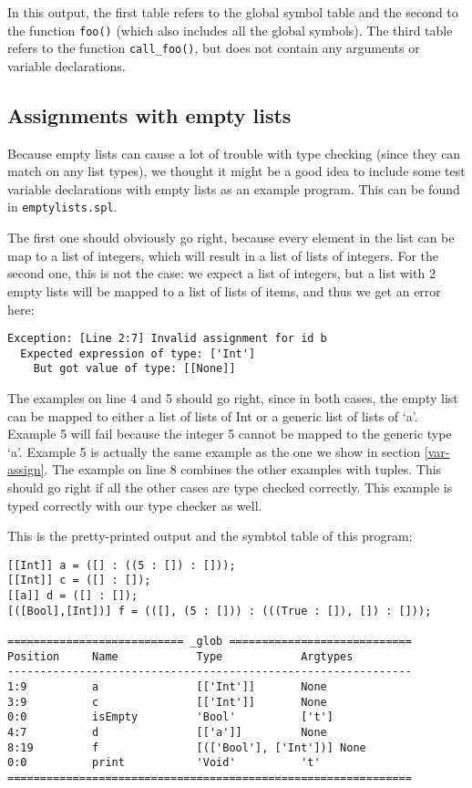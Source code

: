\documentclass[a4paper]{article}
\begin{document}
In this output, the first table refers to the global symbol table and the second to the function {\tt foo()} (which also includes all the global symbols). The third table refers to the function {\tt call\_foo()}, but does not contain any arguments or variable declarations.

\subsection{Assignments with empty lists}
Because empty lists can cause a lot of trouble with type checking (since they can match on any list types), we thought it might be a good idea to include some test variable declarations with empty lists as an example program. This can be found in {\tt emptylists.spl}. 

The first one should obviously go right, because every element in the list can be map to a list of integers, which will result in a list of lists of integers. For the second one, this is not the case: we expect a list of integers, but a list with 2 empty lists will be mapped to a list of lists of items, and thus we get an error here:
\begin{verbatim}
Exception: [Line 2:7] Invalid assignment for id b
  Expected expression of type: ['Int']
    But got value of type: [[None]]
\end{verbatim}
The examples on line 4 and 5 should go right, since in both cases, the empty list can be mapped to either a list of lists of Int or a generic list of lists of `a'. Example 5 will fail because the integer 5 cannot be mapped to the generic type `a'. Example 5 is actually the same example as the one we show in section \ref{var-assign}. The example on line 8 combines the other examples with tuples. This should go right if all the other cases are type checked correctly. This example is typed correctly with our type checker as well.

This is the pretty-printed output and the symbtol table of this program: 
\begin{verbatim}
[[Int]] a = ([] : ((5 : []) : []));
[[Int]] c = ([] : []);
[[a]] d = ([] : []);
[([Bool],[Int])] f = (([], (5 : [])) : (((True : []), []) : []));

=========================== _glob ============================
Position     Name            Type            Argtypes            
--------------------------------------------------------------
1:9          a               [['Int']]       None                
3:9          c               [['Int']]       None                
0:0          isEmpty         'Bool'          ['t']               
4:7          d               [['a']]         None                
8:19         f               [(['Bool'], ['Int'])] None                
0:0          print           'Void'          't'                 
==============================================================
\end{verbatim}
\end{document}

